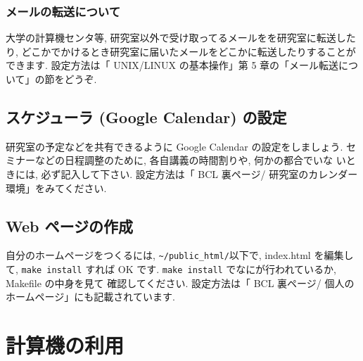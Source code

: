 \documentclass{jarticle}
\begin{document}
\subsubsection{メールの転送について\label{sec:forward}}

大学の計算機センタ等, 研究室以外で受け取ってるメールをを研究室に転送したり,
どこかでかけるとき研究室に届いたメールをどこかに転送したりすることができます.
設定方法は「 UNIX/LINUX の基本操作」第 5 章の「メール転送について」の節をどうぞ.



\subsection{スケジューラ (Google Calendar) の設定}

研究室の予定などを共有できるように Google Calendar の設定をしましょう.
セミナーなどの日程調整のために, 各自講義の時間割りや, 何かの都合でいな
いときには, 必ず記入して下さい.
設定方法は「 BCL 裏ページ/ 研究室のカレンダー環境」をみてください.



\subsection{Web ページの作成}

自分のホームページをつくるには, \verb|~/public_html/|以下で,
index.html を編集して, \verb|make install| すれば OK です.
\verb|make install| でなにが行われているか, Makefile の中身を見て
確認してください.
設定方法は「 BCL 裏ページ/ 個人のホームページ」にも記載されています.


\section{計算機の利用}
\end{document}
